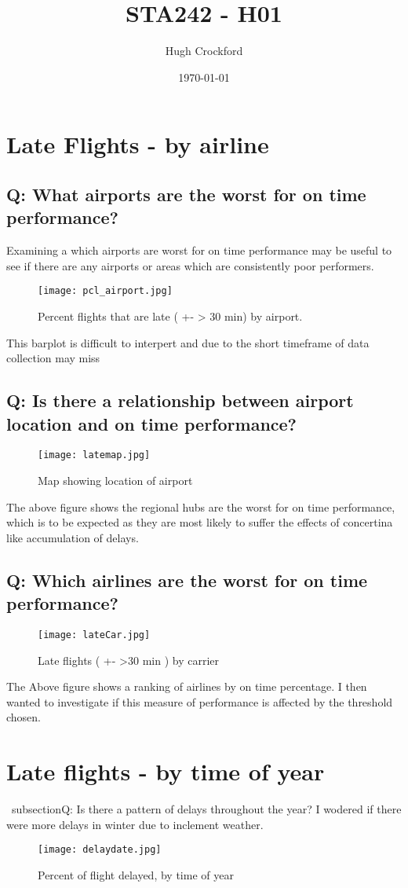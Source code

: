 \documentclass[12pt]{article}
\title{STA242 - H01}
\author{Hugh Crockford}
\date{\today}
\begin{document}
	\maketitle
	\tableofcontents
	\clearpage
	\section{Late Flights - by airline }
	\subsection{Q: What airports are the worst for on time performance?}
		Examining a which airports are worst for on time performance may be useful to see if there are any airports or areas which are consistently poor performers.
		\begin{figure}[h!b]
			\centering
			\texttt{[image: pcl\_airport.jpg]}
			\caption{Percent flights that are late ( +- > 30 min) by airport. }
		\end{figure}
		This barplot is difficult to interpert and due to the short timeframe of data collection may miss 
	\newpage
	\subsection{Q: Is there a relationship between airport location and on time performance?}
		\begin{figure}[h!]
			\centering
			\texttt{[image: latemap.jpg]}
			\caption{Map showing location of airport}
		\end{figure}
		The above figure shows the regional hubs are the worst for on time performance, which is to be expected as they are most likely to suffer the effects of concertina like accumulation of delays.
	\newpage
	\subsection{Q: Which airlines are the worst for on time performance?}
	\begin{figure}[h!]
		\centering
		\texttt{[image: lateCar.jpg]}
		\caption{Late flights ( +- >30 min ) by carrier}
	\end{figure}
	The Above figure shows a ranking of airlines by on time percentage.
	I then wanted to investigate if this measure of performance is affected by the threshold chosen.
	\newpage
	\section {Late flights - by time of year}
		\ subsection{Q: Is there a pattern of delays throughout the year?}
			I wodered if there were more delays in winter due to inclement weather.
		 	\begin{figure}[h!]
				\centering
				\texttt{[image: delaydate.jpg]}
				\caption{Percent of flight delayed, by time of year}
			\end{figure}
			\newpage
\end{document}
